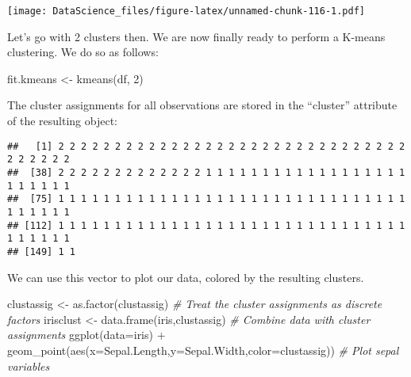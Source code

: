 \documentclass[
]{book}
\newenvironment{Shaded}{\begin{snugshade}}{\end{snugshade}}
\newcommand{\AttributeTok}[1]{\textcolor[rgb]{0.77,0.63,0.00}{#1}}
\newcommand{\CommentTok}[1]{\textcolor[rgb]{0.56,0.35,0.01}{\textit{#1}}}
\newcommand{\DecValTok}[1]{\textcolor[rgb]{0.00,0.00,0.81}{#1}}
\newcommand{\FunctionTok}[1]{\textcolor[rgb]{0.00,0.00,0.00}{#1}}
\newcommand{\NormalTok}[1]{#1}
\newcommand{\OtherTok}[1]{\textcolor[rgb]{0.56,0.35,0.01}{#1}}
\newcommand{\SpecialCharTok}[1]{\textcolor[rgb]{0.00,0.00,0.00}{#1}}
\begin{document}
\texttt{[image: DataScience\_files/figure-latex/unnamed-chunk-116-1.pdf]}

Let's go with 2 clusters then. We are now finally ready to perform a K-means clustering. We do so as follows:

\begin{Shaded}
\begin{Highlighting}[]
\NormalTok{fit.kmeans }\OtherTok{\textless{}{-}} \FunctionTok{kmeans}\NormalTok{(df, }\DecValTok{2}\NormalTok{)}
\end{Highlighting}
\end{Shaded}

The cluster assignments for all observations are stored in the ``cluster'' attribute of the resulting object:

\begin{Shaded}
\end{Shaded}

\begin{verbatim}
##   [1] 2 2 2 2 2 2 2 2 2 2 2 2 2 2 2 2 2 2 2 2 2 2 2 2 2 2 2 2 2 2 2 2 2 2 2 2 2
##  [38] 2 2 2 2 2 2 2 2 2 2 2 2 2 1 1 1 1 1 1 1 1 1 1 1 1 1 1 1 1 1 1 1 1 1 1 1 1
##  [75] 1 1 1 1 1 1 1 1 1 1 1 1 1 1 1 1 1 1 1 1 1 1 1 1 1 1 1 1 1 1 1 1 1 1 1 1 1
## [112] 1 1 1 1 1 1 1 1 1 1 1 1 1 1 1 1 1 1 1 1 1 1 1 1 1 1 1 1 1 1 1 1 1 1 1 1 1
## [149] 1 1
\end{verbatim}

We can use this vector to plot our data, colored by the resulting clusters.

\begin{Shaded}
\begin{Highlighting}[]
\NormalTok{clustassig }\OtherTok{\textless{}{-}} \FunctionTok{as.factor}\NormalTok{(clustassig) }\CommentTok{\# Treat the cluster assignments as discrete factors}
\NormalTok{irisclust }\OtherTok{\textless{}{-}} \FunctionTok{data.frame}\NormalTok{(iris,clustassig) }\CommentTok{\# Combine data with cluster assignments}
\FunctionTok{ggplot}\NormalTok{(}\AttributeTok{data=}\NormalTok{iris) }\SpecialCharTok{+} \FunctionTok{geom\_point}\NormalTok{(}\FunctionTok{aes}\NormalTok{(}\AttributeTok{x=}\NormalTok{Sepal.Length,}\AttributeTok{y=}\NormalTok{Sepal.Width,}\AttributeTok{color=}\NormalTok{clustassig)) }\CommentTok{\# Plot sepal variables}
\end{Highlighting}
\end{Shaded}
\end{document}
